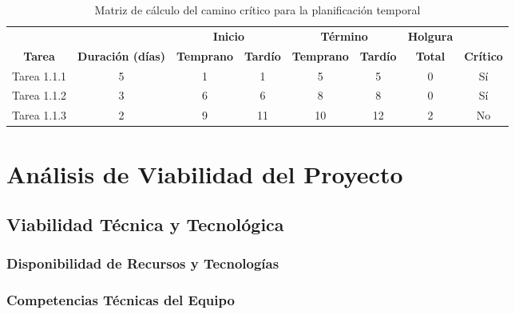 \begin{table}[hbt]
	\centering
	\small
	\begin{tabular}{|c|c|cc|cc|c|c|}\hline
		& & \multicolumn{2}{|c|}{\textbf{Inicio}} & \multicolumn{2}{|c|}{\textbf{Término}} & \textbf{Holgura} & \\
		\textbf{Tarea}& \textbf{Duración (días)}& \textbf{Temprano} &\textbf{Tardío} &\textbf{Temprano} &\textbf{Tardío} &\textbf{Total}  &\textbf{Crítico} \\\hline
		Tarea 1.1.1 & 5 & 1 & 1 & 5 & 5 & 0 & Sí \\\hline
		Tarea 1.1.2 & 3 & 6 & 6 & 8 & 8 & 0 & Sí \\\hline
		Tarea 1.1.3 & 2 & 9 & 11 & 10 & 12 & 2 & No \\\hline
	\end{tabular}
	\caption{Matriz de cálculo del camino crítico para la planificación temporal}
	\label{tab:caminocritico}
\end{table}




\section{Análisis de Viabilidad del Proyecto}

\subsection{Viabilidad Técnica y Tecnológica}


\subsubsection{Disponibilidad de Recursos y Tecnologías}
\subsubsection{Competencias Técnicas del Equipo}
